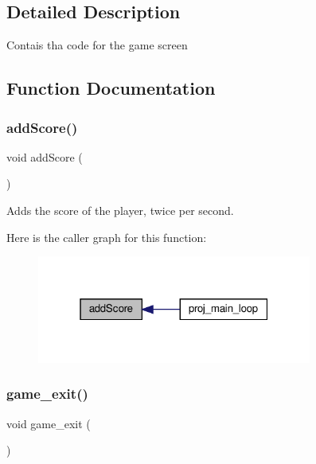 \subsection{Detailed Description}
Contais tha code for the game screen 

\subsection{Function Documentation}
\mbox{\label{group__Game_ga3f24f1f331ba8708f4661eec7872b914}} 
\subsubsection{\texorpdfstring{add\+Score()}{addScore()}}
{\footnotesize\ttfamily void add\+Score (\begin{DoxyParamCaption}{ }\end{DoxyParamCaption})}



Adds the score of the player, twice per second. 

Here is the caller graph for this function\+:\nopagebreak
\begin{figure}[H]
\begin{center}
\leavevmode
\includegraphics[width=256pt]{group__Game_ga3f24f1f331ba8708f4661eec7872b914_icgraph}
\end{center}
\end{figure}
\mbox{\label{group__Game_gad082b8fe4e94ee090f0c6c9d11b4d565}} 
\subsubsection{\texorpdfstring{game\+\_\+exit()}{game\_exit()}}
{\footnotesize\ttfamily void game\+\_\+exit (\begin{DoxyParamCaption}{ }\end{DoxyParamCaption})}



